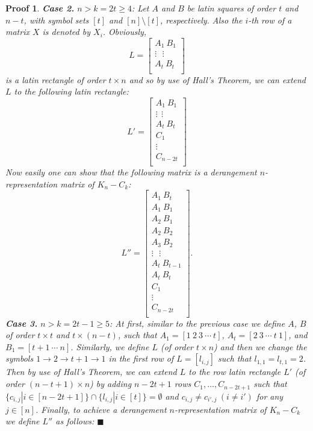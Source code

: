 \documentclass[11pt,letterpaper]{article}
\newtheorem{preproof}{{\bf Proof}}
\newenvironment{proof}[1]{\begin{preproof}{\rm
			#1}\hfill{$\blacksquare$}}{\end{preproof}}
\begin{document}
{\begin{proof}
{{\bf Case 2.} $n>k=2t\geq4$: Let $A$ and $B$ be latin squares of order $t$ and $n-t$, with symbol sets $[t]$ and $[n]\setminus [t]$, respectively. Also the $i$-th row of a matrix $X$ is denoted by $X_i$. Obviously,
\[L=\left[\begin{array}{c}
A_1\ B_1 \\
\vdots \ \ \ \vdots \\
A_{t}\ B_{t} \\
\end{array}\right]\]
is a latin rectangle of order $t\times n$ and so by use of Hall's Theorem, we can extend $L$ to the following latin rectangle:
\[L'=\left[\begin{array}{c}
A_1\ B_1 \\
\vdots\ \ \vdots \\
A_{t}\ B_{t} \\
 C_{1} \\
 \vdots \\
 C_{n-2t} \\
\end{array}\right]\]
Now easily one can show that the following matrix is a derangement $n$-representation matrix of $K_n-C_k$:
\[L''=\left[\begin{array}{c}
A_1\ B_t \\
A_1\ B_1 \\
A_2\ B_1 \\
A_2\ B_2 \\
A_3\ B_2 \\
\vdots\ \ \ \vdots \\
A_{t}\ B_{t-1} \\
A_{t}\ B_t \\
 C_{1} \\
 \vdots \\
 C_{n-2t} \\
  \end{array}\right].\]
{\bf Case 3.} $n>k=2t-1\geq5$: At first, similar to the previous case we define $A$, $B$ of order $t\times t$ and $t\times (n-t)$, such that $A_1=[1\ 2\ 3\ \cdots\ t]$, $A_t=[2\ 3\ \cdots\ t\ 1]$, and $B_1=[t+1\ \cdots \ n]$. Similarly, we define $L$ (of order $t\times n$) and then we change the symbols $1\rightarrow2\rightarrow t+1 \rightarrow1$ in the first row of $L=[l_{i,j}]$ such that $l_{1,1}=l_{t,1}=2$. Then by use of Hall's Theorem, we can extend $L$ to the row latin rectangle $L'$ (of order $(n-t+1)\times n$) by adding $n-2t+1$ rows $C_1,\ldots,C_{n-2t+1}$ such that $\{c_{i,j}| i\in[n-2t+1]\}\cap\{l_{i,j}| i\in[t]\}=\emptyset$ and $c_{i,j}\neq c_{i',j}\ (i\neq i')$ for any $j\in[n]$. Finally, to achieve a derangement $n$-representation matrix of $K_n-C_k$ we define $L''$ as follows:
}
\end{proof}}
\end{document}

